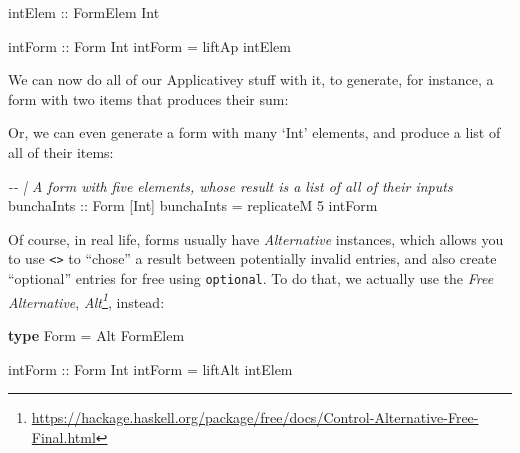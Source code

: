 \documentclass[]{article}
\newenvironment{Shaded}{}{}
\newcommand{\CommentTok}[1]{\textcolor[rgb]{0.38,0.63,0.69}{\textit{#1}}}
\newcommand{\DataTypeTok}[1]{\textcolor[rgb]{0.56,0.13,0.00}{#1}}
\newcommand{\DecValTok}[1]{\textcolor[rgb]{0.25,0.63,0.44}{#1}}
\newcommand{\KeywordTok}[1]{\textcolor[rgb]{0.00,0.44,0.13}{\textbf{#1}}}
\newcommand{\NormalTok}[1]{#1}
\newcommand{\OperatorTok}[1]{\textcolor[rgb]{0.40,0.40,0.40}{#1}}
\newcommand{\OtherTok}[1]{\textcolor[rgb]{0.00,0.44,0.13}{#1}}
\renewcommand{\href}[2]{#2\footnote{\url{#1}}}
\begin{document}
\begin{Shaded}
\begin{Highlighting}[]
\OtherTok{intElem ::} \DataTypeTok{FormElem} \DataTypeTok{Int}

\OtherTok{intForm ::} \DataTypeTok{Form} \DataTypeTok{Int}
\NormalTok{intForm }\OtherTok{=}\NormalTok{ liftAp intElem}
\end{Highlighting}
\end{Shaded}

We can now do all of our Applicativey stuff with it, to generate, for instance,
a form with two items that produces their sum:

\begin{Shaded}
\end{Shaded}

Or, we can even generate a form with many `Int' elements, and produce a list of
all of their items:

\begin{Shaded}
\begin{Highlighting}[]
\CommentTok{{-}{-} | A form with five elements, whose result is a list of all of their inputs}
\OtherTok{bunchaInts ::} \DataTypeTok{Form}\NormalTok{ [}\DataTypeTok{Int}\NormalTok{]}
\NormalTok{bunchaInts }\OtherTok{=}\NormalTok{ replicateM }\DecValTok{5}\NormalTok{ intForm}
\end{Highlighting}
\end{Shaded}

Of course, in real life, forms usually have \emph{Alternative} instances, which
allows you to use \texttt{\textless{}\textbar{}\textgreater{}} to ``chose'' a
result between potentially invalid entries, and also create ``optional'' entries
for free using \texttt{optional}. To do that, we actually use the \emph{Free
Alternative},
\emph{\href{https://hackage.haskell.org/package/free/docs/Control-Alternative-Free-Final.html}{Alt}},
instead:

\begin{Shaded}
\begin{Highlighting}[]
\KeywordTok{type} \DataTypeTok{Form} \OtherTok{=} \DataTypeTok{Alt} \DataTypeTok{FormElem}

\OtherTok{intForm ::} \DataTypeTok{Form} \DataTypeTok{Int}
\NormalTok{intForm }\OtherTok{=}\NormalTok{ liftAlt intElem}
\end{Highlighting}
\end{Shaded}
\end{document}
